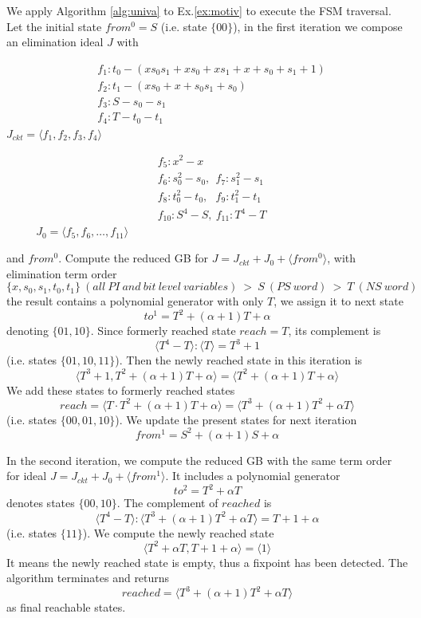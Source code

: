 \begin{Example}
We apply Algorithm \ref{alg:univa} to Ex.\ref{ex:motiv} to execute the FSM traversal. Let the initial state
$from^0 = S$ (i.e. state $\{00\}$), in the first iteration we compose an elimination ideal $J$ with

\begin{minipage}[h]{0.4\textwidth}
\begin{align*}
&f_1: t_0- (xs_0s_1+xs_0+xs_1+x+s_0+s_1+1)\\
&f_2: t_1 - (xs_0+x+s_0s_1+s_0)\\
&f_3: S - s_0 - s_1\\
&f_4: T - t_0 - t_1
\end{align*}
$J_{ckt} = \langle f_1,f_2,f_3,f_4\rangle$
\end{minipage}
\begin{minipage}[h]{0.6\textwidth}
\begin{align*}
&f_5: x^2-x\\
&f_6: s_0^2-s_0, ~~f_7: s_1^2-s_1\\
&f_8: t_0^2-t_0, ~~~f_9: t_1^2-t_1\\
&f_{10}: S^4-S, ~f_{11}:T^4-T
\end{align*}
$\ \ \ \ \ \ \ \ \ \ \  \ J_0 = \langle f_5,f_6,\dots,f_{11}\rangle$
\end{minipage}

and $from^0$. Compute the reduced GB for $J = J_{ckt}+J_0+\langle from^0\rangle$,
with elimination term order
$$\{x,s_0,s_1,t_0,t_1\}~(all~PI~and~bit~level~variables)~>~S~(PS~word)~ >~ T~(NS~word)$$
the result contains
a polynomial generator with only $T$, we assign it to next state $$to^1 = T^2+(\alpha+1)T+\alpha$$ denoting
$\{01,10\}$. Since formerly reached state $reach = T$, its complement is $$\langle T^4-T\rangle:\langle T\rangle
= T^3+1$$ (i.e. states $\{01,10,11\}$). Then the newly reached state in this iteration is
$$\langle T^3+1, T^2+(\alpha+1)T+\alpha \rangle = \langle T^2+(\alpha+1)T+\alpha \rangle$$ We add these states
to formerly reached states $$reach = \langle T\cdot T^2+(\alpha+1)T+\alpha \rangle = \langle T^3+(\alpha+1)T^2+\alpha T\rangle$$
(i.e. states $\{00,01,10\}$). We update the present states for next iteration $$from^1 = S^2+(\alpha+1)S+\alpha$$

In the second iteration, we compute the reduced GB with the same term order for ideal $J = J_{ckt}+J_0+\langle from^1\rangle$.
It includes a polynomial generator $$to^2 = T^2+\alpha T$$ denotes states
$\{00,10\}$. The complement of $reached$ is $$\langle T^4-T\rangle:\langle T^3+(\alpha+1)T^2+\alpha T\rangle
= T + 1+\alpha$$ (i.e. states $\{11\}$). We compute the newly reached state 
$$\langle T^2+\alpha T, T+1+\alpha \rangle = \langle 1\rangle$$ 
It means the newly reached state is empty, thus a fixpoint has been detected. The algorithm terminates and returns
$$reached = \langle T^3+(\alpha+1)T^2+\alpha T\rangle$$ as final reachable states.


\end{Example}
